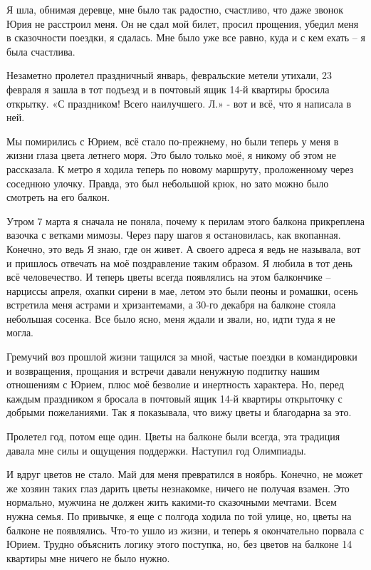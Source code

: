 Я шла, обнимая деревце, мне было так радостно, счастливо, что даже звонок Юрия
не расстроил меня. Он не сдал мой билет, просил прощения, убедил меня в
сказочности поездки, я сдалась. Мне было уже все равно, куда и с кем ехать – я
была счастлива.

Незаметно пролетел праздничный январь, февральские метели утихали, 23 февраля я
зашла в тот подъезд и в почтовый ящик 14-й квартиры бросила открытку. «С
праздником! Всего наилучшего. Л.» - вот и всё, что я написала в ней.

Мы помирились с Юрием, всё стало по-прежнему, но были теперь у меня в жизни
глаза цвета летнего моря. Это было только моё, я никому об этом не рассказала.
К метро я ходила теперь по новому маршруту, проложенному через соседнюю улочку.
Правда, это был небольшой крюк, но зато можно было смотреть на его балкон.

Утром 7 марта я сначала не поняла, почему к перилам этого балкона прикреплена
вазочка с ветками мимозы. Через пару шагов я остановилась, как вкопанная.
Конечно, это ведь Я знаю, где он живет. А своего адреса я ведь не называла, вот
и пришлось отвечать на моё поздравление таким образом. Я любила в тот день всё
человечество. И теперь цветы всегда появлялись на этом балкончике – нарциссы
апреля, охапки сирени в мае, летом это были пеоны и ромашки, осень встретила
меня астрами и хризантемами, а 30-го декабря на балконе стояла небольшая
сосенка. Все было ясно, меня ждали и звали, но, идти туда я не могла.

Гремучий воз прошлой жизни тащился за мной, частые поездки в командировки и
возвращения, прощания и встречи давали ненужную подпитку нашим отношениям с
Юрием, плюс моё безволие и инертность характера. Но, перед каждым праздником я
бросала в почтовый ящик 14-й квартиры открыточку с добрыми пожеланиями. Так я
показывала, что вижу цветы и благодарна за это.

Пролетел год, потом еще один. Цветы на балконе были всегда, эта традиция давала
мне силы и ощущения поддержки. Наступил год Олимпиады.

И вдруг цветов не стало. Май для меня превратился в ноябрь. Конечно, не может
же хозяин таких глаз дарить цветы незнакомке, ничего не получая взамен. Это
нормально, мужчина не должен жить какими-то сказочными мечтами. Всем нужна
семья. По привычке, я еще с полгода ходила по той улице, но, цветы на балконе
не появлялись. Что-то ушло из жизни, и теперь я окончательно порвала с Юрием.
Трудно объяснить логику этого поступка, но, без цветов на балконе 14 квартиры
мне ничего не было нужно.

